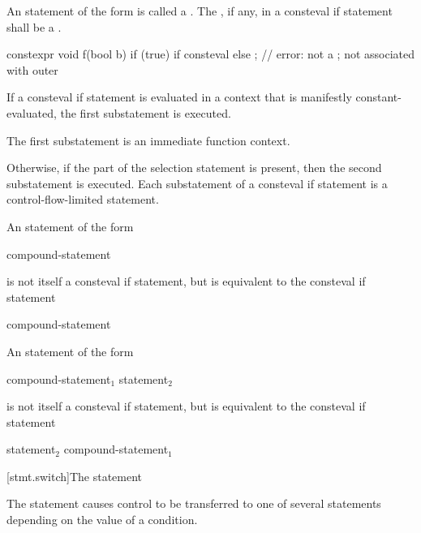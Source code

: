 \pnum
An  statement of the form 
is called a .
The , if any, in a consteval if statement
shall be a .
\begin{example}
\begin{codeblock}
constexpr void f(bool b) {
  if (true)
    if consteval { }
    else ;              // error: not a ;  not associated with outer 
}
\end{codeblock}
\end{example}

\pnum
If a consteval if statement is evaluated in a context
that is manifestly constant-evaluated,
the first substatement is executed.
\begin{note}
The first substatement is an immediate function context.
\end{note}
Otherwise, if the  part of the selection statement is present,
then the second substatement is executed.
Each substatement of a consteval if statement is a control-flow-limited
statement.

\pnum
An  statement of the form
\begin{ncsimplebnf}
 \terminal{!}  compound-statement
\end{ncsimplebnf}
is not itself a consteval if statement,
but is equivalent to the consteval if statement
\begin{ncsimplebnf}
  \terminal{\{} \terminal{\}}  compound-statement
\end{ncsimplebnf}
An  statement of the form
\begin{ncsimplebnf}
 \terminal{!}  compound-statement$_1$  statement$_2$
\end{ncsimplebnf}
is not itself a consteval if statement,
but is equivalent to the consteval if statement
\begin{ncsimplebnf}
  statement$_2$  compound-statement$_1$
\end{ncsimplebnf}

[stmt.switch]{The  statement}%

\pnum
The  statement causes control to be transferred to one of
several statements depending on the value of a condition.

